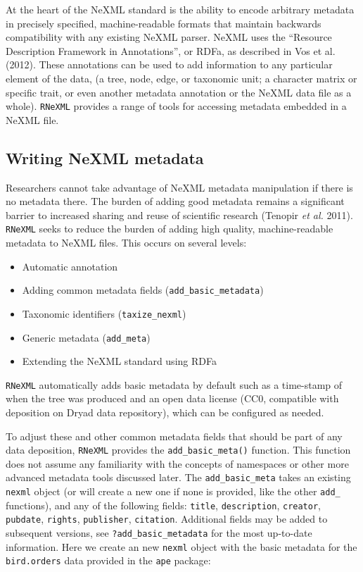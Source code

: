 \documentclass[author-year, review, 11pt]{components/elsarticle} %
\begin{document}
At the heart of the NeXML standard is the ability to encode arbitrary
metadata in precisely specified, machine-readable formats that maintain
backwards compatibility with any existing NeXML parser. NeXML uses the
``Resource Description Framework in Annotations'', or RDFa, as described
in Vos et al. (2012). These annotations can be used to add information
to any particular element of the data, (a tree, node, edge, or taxonomic
unit; a character matrix or specific trait, or even another metadata
annotation or the NeXML data file as a whole). \texttt{RNeXML} provides
a range of tools for accessing metadata embedded in a NeXML file.

\subsection{Writing NeXML metadata}\label{writing-nexml-metadata}

Researchers cannot take advantage of NeXML metadata manipulation if
there is no metadata there. The burden of adding good metadata remains a
significant barrier to increased sharing and reuse of scientific
research (Tenopir \emph{et al.} 2011). \texttt{RNeXML} seeks to reduce
the burden of adding high quality, machine-readable metadata to NeXML
files. This occurs on several levels:

\begin{itemize}
\itemsep1pt\parskip0pt
\item
  Automatic annotation
\item
  Adding common metadata fields (\texttt{add\_basic\_metadata})
\item
  Taxonomic identifiers (\texttt{taxize\_nexml})
\item
  Generic metadata (\texttt{add\_meta})
\item
  Extending the NeXML standard using RDFa
\end{itemize}

\texttt{RNeXML} automatically adds basic metadata by default such as a
time-stamp of when the tree was produced and an open data license (CC0,
compatible with deposition on Dryad data repository), which can be
configured as needed.

To adjust these and other common metadata fields that should be part of
any data deposition, \texttt{RNeXML} provides the
\texttt{add\_basic\_meta()} function. This function does not assume any
familiarity with the concepts of namespaces or other more advanced
metadata tools discussed later. The \texttt{add\_basic\_meta} takes an
existing \texttt{nexml} object (or will create a new one if none is
provided, like the other \texttt{add\_} functions), and any of the
following fields: \texttt{title}, \texttt{description},
\texttt{creator}, \texttt{pubdate}, \texttt{rights}, \texttt{publisher},
\texttt{citation}. Additional fields may be added to subsequent
versions, see \texttt{?add\_basic\_metadata} for the most up-to-date
information. Here we create an new \texttt{nexml} object with the basic
metadata for the \texttt{bird.orders} data provided in the \texttt{ape}
package:
\end{document}
